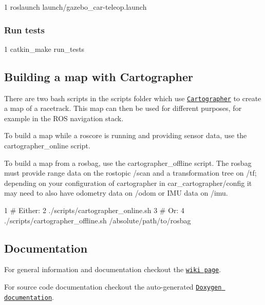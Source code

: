 \begin{DoxyCode}
1 roslaunch launch/gazebo\_car-teleop.launch
\end{DoxyCode}


\subsubsection*{Run tests}


\begin{DoxyCode}
1 catkin\_make run\_tests
\end{DoxyCode}


\subsection*{Building a map with Cartographer}

There are two bash scripts in the {\ttfamily scripts} folder which use \href{https://github.com/googlecartographer/cartographer_ros}{\tt Cartographer} to create a map of a racetrack. This map can then be used for different purposes, for example in the R\+OS navigation stack.


\begin{DoxyItemize}
\item To build a map while a roscore is running and providing sensor data, use the {\ttfamily cartographer\+\_\+online} script.
\item To build a map from a rosbag, use the {\ttfamily cartographer\+\_\+offline} script. The rosbag must provide range data on the rostopic {\ttfamily /scan} and a transformation tree on {\ttfamily /tf}; depending on your configuration of cartographer in {\ttfamily car\+\_\+cartographer/config} it may need to also have odometry data on {\ttfamily /odom} or I\+MU data on {\ttfamily /imu}.
\end{DoxyItemize}


\begin{DoxyCode}
1 # Either:
2 ./scripts/cartographer\_online.sh
3 # Or:
4 ./scripts/cartographer\_offline.sh /absolute/path/to/rosbag
\end{DoxyCode}


\subsection*{Documentation}


\begin{DoxyItemize}
\item For general information and documentation checkout the \href{https://github.com/Autonomous-Racing-PG/ros.package/wiki}{\tt wiki page}.
\item For source code documentation checkout the auto-\/generated \href{https://autonomous-racing-pg.github.io/ros.package/html/index.html}{\tt Doxygen documentation}.
\end{DoxyItemize}

